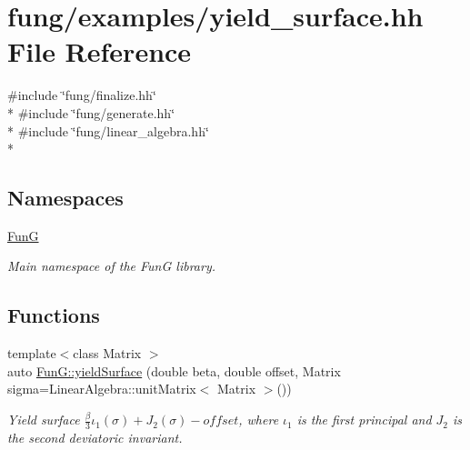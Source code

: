 \hypertarget{yield__surface_8hh}{}\section{fung/examples/yield\+\_\+surface.hh File Reference}
\label{yield__surface_8hh}
{\ttfamily \#include \char`\"{}fung/finalize.\+hh\char`\"{}}\\*
{\ttfamily \#include \char`\"{}fung/generate.\+hh\char`\"{}}\\*
{\ttfamily \#include \char`\"{}fung/linear\+\_\+algebra.\+hh\char`\"{}}\\*
\subsection*{Namespaces}
\begin{DoxyCompactItemize}
\item 
 \hyperlink{namespaceFunG}{FunG}
\begin{DoxyCompactList}\small\item\em Main namespace of the FunG library. \end{DoxyCompactList}\end{DoxyCompactItemize}
\subsection*{Functions}
\begin{DoxyCompactItemize}
\item 
{\footnotesize template$<$class Matrix $>$ }\\auto \hyperlink{namespaceFunG_a4784211358c877f05ad9426850303273}{Fun\+G\+::yield\+Surface} (double beta, double offset, Matrix sigma=Linear\+Algebra\+::unit\+Matrix$<$ Matrix $>$())
\begin{DoxyCompactList}\small\item\em Yield surface $ \frac{\beta}{3}\iota_1(\sigma) + J_2(\sigma)-offset $, where $\iota_1$ is the first principal and $J_2$ is the second deviatoric invariant. \end{DoxyCompactList}\end{DoxyCompactItemize}
